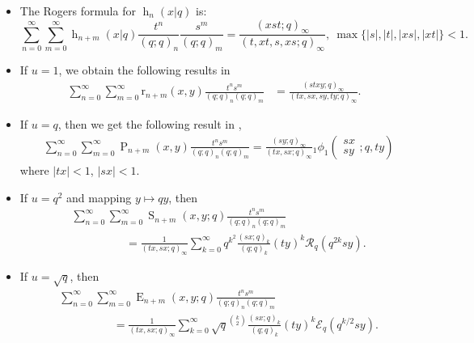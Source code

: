\documentclass{cimart}
\newcommand{\EE}{\mathcal{E}}
\newcommand{\RR}{\mathcal{R}}
\DeclareMathOperator{\opE}{E}
\DeclareMathOperator{\oph}{h}
\DeclareMathOperator{\opP}{P}
\DeclareMathOperator{\opS}{S}
\begin{document}
\begin{itemize}
    \item
    The Rogers formula for $\oph_{n}(x|q)$ is:
\begin{equation*}
    \sum_{n=0}^{\infty}\sum_{m=0}^{\infty}\oph_{n+m}(x|q)\frac{t^n}{(q;q)_{n}}\frac{s^m}{(q;q)_{m}}=\frac{(x st;q)_{\infty}}{(t,x t,s,xs;q)_{\infty}},\ \max\{\vert s\vert,\vert t\vert,\vert xs\vert,\vert xt\vert\}<1.
\end{equation*}

    \item 
    If $u=1$, we obtain the following results in \cite{saad}
\begin{align*}
    \sum_{n=0}^{\infty}\sum_{m=0}^{\infty}\mathrm{r}_{n+m}(x,y)\frac{t^{n}s^{m}}{(q;q)_{n}(q;q)_{m}}
        &=\frac{(stxy;q)_{\infty}}{(tx,sx,sy,ty;q)_{\infty}}.
\end{align*}
    
    \item
    If $u=q$, then we get the following result in \cite{saad2},
\begin{align*}
    &\sum_{n=0}^{\infty}\sum_{m=0}^{\infty}\opP_{n+m}(x,y)\frac{t^{n}s^{m}}{(q;q)_{n}(q;q)_{m}}=\frac{(sy;q)_{\infty}}{(tx,sx;q)_{\infty}}{}_{1}\phi_{1}\left(
        \begin{array}{c}
             sx \\
             sy
        \end{array};
        q,ty
        \right)
\end{align*}
where $\vert tx\vert<1$, $\vert sx\vert<1$.

    \item 
    If $u=q^2$ and mapping $y\mapsto qy$, then
\begin{align}
    &\sum_{n=0}^{\infty}\sum_{m=0}^{\infty}\opS_{n+m}(x,y;q)\frac{t^{n}s^{m}}{(q;q)_{n}(q;q)_{m}}\nonumber\\
    &\hspace{2cm}=\frac{1}{(tx,sx;q)_{\infty}}\sum_{k=0}^{\infty}q^{k^2}\frac{(sx;q)_{k}}{(q;q)_{k}}(ty)^k\RR_{q}(q^{2k}sy).
\end{align}

    \item 
    If $u=\sqrt{q}$, then
    \begin{align}
    &\sum_{n=0}^{\infty}\sum_{m=0}^{\infty}\opE_{n+m}(x,y;q)\frac{t^{n}s^{m}}{(q;q)_{n}(q;q)_{m}}\nonumber\\
    &\hspace{2cm}=\frac{1}{(tx,sx;q)_{\infty}}\sum_{k=0}^{\infty}\sqrt{q}^{\binom{k}{2}}\frac{(sx;q)_{k}}{(q;q)_{k}}(ty)^k\EE_{q}(q^{k/2}sy).
\end{align}
\end{itemize}
\end{document}
